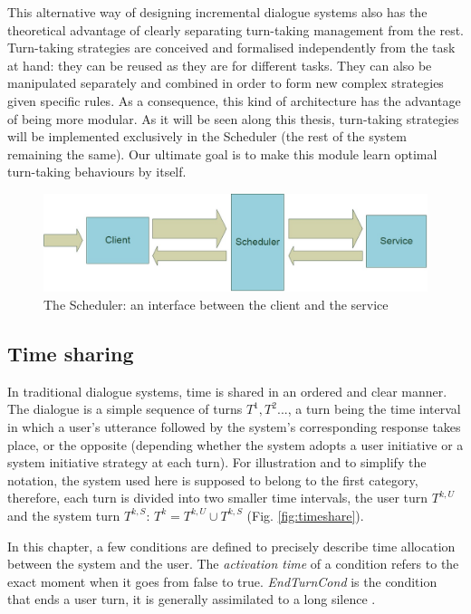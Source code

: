         This alternative way of designing incremental dialogue systems also has the theoretical advantage of clearly separating turn-taking management from the rest. Turn-taking strategies are conceived and formalised independently from the task at hand: they can be reused as they are for different tasks. They can also be manipulated separately and combined in order to form new complex strategies given specific rules. As a consequence, this kind of architecture has the advantage of being more modular. As it will be seen along this thesis, turn-taking strategies will be implemented exclusively in the Scheduler (the rest of the system remaining the same). Our ultimate goal is to make this module learn optimal turn-taking behaviours by itself.
        
     	\begin{figure}[t]
          \centering
          \includegraphics[scale=0.4]{figures/ClientSchedService.jpg}
          \caption{The Scheduler: an interface between the client and the service}
          \label{fig:archioverview}
        \end{figure}
        
    \subsection{Time sharing}
    
    	In traditional dialogue systems, time is shared in an ordered and clear manner. The dialogue is a simple sequence of turns $T^1,T^2...$, a turn being the time interval in which a user's utterance followed by the system's corresponding response takes place, or the opposite (depending whether the system adopts a user initiative or a system initiative strategy at each turn). For illustration and to simplify the notation, the system used here is supposed to belong to the first category, therefore, each turn is divided into two smaller time intervals, the user turn $T^{k,U}$ and the system turn $T^{k,S}$: $T^k = T^{k,U} \cup T^{k,S}$ (Fig. \ref{fig:timeshare}).
        
        In this chapter, a few conditions are defined to precisely describe time allocation between the system and the user. The \textit{activation time} of a condition refers to the exact moment when it goes from false to true. \textit{EndTurnCond} is the condition that ends a user turn, it is generally assimilated to a long silence \cite{Raux2008,Wlodarczak2013}.
        
